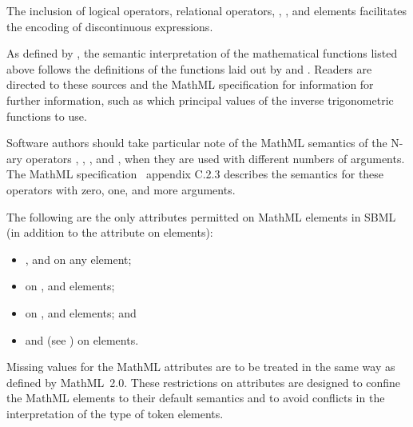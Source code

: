 The inclusion of logical operators, relational operators,
, , and  elements
facilitates the encoding of discontinuous expressions.

As defined by \mathmltwo, the semantic interpretation of the
mathematical functions listed above follows the definitions of the
functions laid out by \cite{abramowitz:1997} and
\cite{zwillinger:1988}.  Readers are directed to these sources and
the MathML specification for information for further information,
such as which principal values of the inverse trigonometric functions to
use.

Software authors should take particular note of the MathML
semantics of the N-ary operators , ,
,  and , when they are used with
different numbers of arguments.  The MathML
specification~\citep{w3c:2000b} appendix C.2.3 describes the
semantics for these operators with zero, one, and more arguments.

The following are the only attributes permitted on MathML elements
in SBML (in addition to the  attribute on
 elements):
\begin{itemize}\setlength{\parskip}{-0.3ex}

\item {},  and  on any element;

\item {} on ,
     and  elements;

\item {} on , 
    and  elements; and

\item {} and 
  (see ) on  elements.

\end{itemize}
Missing values for the MathML attributes are to be treated in the
same way as defined by MathML~2.0.  These restrictions on
attributes are designed to confine the MathML elements to their
default semantics and to avoid conflicts in the interpretation of
the type of token elements.


